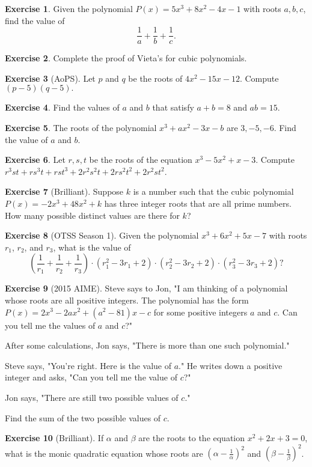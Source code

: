 \documentclass[l1pt]{article}
\theoremstyle{plain}
\theoremstyle{definition}
\newtheorem{exercise}{Exercise}[section]
\theoremstyle{remark}
\begin{document}
\begin{exercise}
Given the polynomial $P(x)=5x^3+8x^2-4x-1$ with roots $a, b, c$, find the value of \[\frac{1}{a}+\frac{1}{b}+\frac{1}{c}.\]
\end{exercise}

\begin{exercise}
Complete the proof of Vieta's for cubic polynomials.
\end{exercise}

\begin{exercise}[AoPS]
Let $p$ and $q$ be the roots of $4x^2-15x-12$. Compute $(p-5)(q-5).$
\end{exercise}

\begin{exercise}
Find the values of $a$ and $b$ that satisfy $a+b=8$ and $ab=15$.
\end{exercise}

\begin{exercise}
The roots of the polynomial $x^3+ax^2-3x-b$ are $3, -5, -6$. Find the value of $a$ and $b$.
\end{exercise}

\begin{exercise}
Let $r, s, t$ be the roots of the equation $x^3-5x^2+x-3$. Compute $r^3st+rs^3t+rst^3+2r^2s^2t+2rs^2t^2+2r^2st^2$.
\end{exercise}

\begin{exercise}[Brilliant]
Suppose $k$ is a number such that the cubic polynomial $P(x)=-2x^3+48x^2+k$ has three integer roots that are all prime numbers. How many possible distinct values are there for $k$?
\end{exercise}

\begin{exercise}[OTSS Season 1]
Given the polynomial $x^3 + 6 x^2 + 5x - 7$ with roots $r_1$, $r_2$, and $r_3$, what is the value of\[\left(\frac{1}{r_1}+\frac{1}{r_2}+\frac{1}{r_3}\right)\cdot (r_1^2-3r_1+2)\cdot (r_2^2-3r_2+2)\cdot (r_3^2-3r_3+2)?\]
\end{exercise}

\begin{exercise}[2015 AIME]
Steve says to Jon, "I am thinking of a polynomial whose roots are all positive integers. The polynomial has the form $P(x)=2x^3-2ax^2+(a^2-81)x-c$ for some positive integers $a$ and $c$. Can you tell me the values of $a$ and $c$?"

After some calculations, Jon says, "There is more than one such polynomial."

Steve says, "You’re right. Here is the value of $a$." He writes down a positive integer and asks, "Can you tell me the value of $c$?"

Jon says, "There are still two possible values of $c$."

Find the sum of the two possible values of $c$.
\end{exercise}

\begin{exercise}[Brilliant]
If $\alpha$ and $\beta$ are the roots to the equation $x^2+2x+3=0$, what is the monic quadratic equation whose roots are $\left(\alpha-\frac{1}{\alpha}\right)^2$ and $\left(\beta-\frac{1}{\beta}\right)^2$.
\end{exercise}
\end{document}
